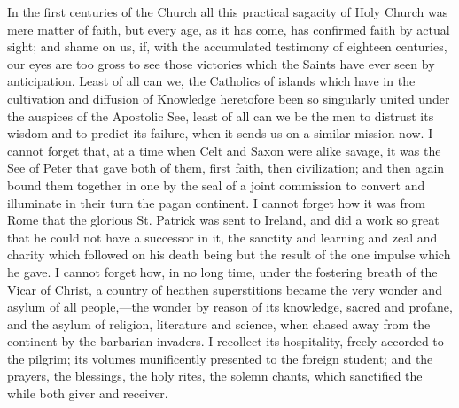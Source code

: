 In the first centuries of the Church all this practical sagacity of Holy Church was mere matter of faith, but every age, as it
has come, has confirmed faith by actual sight; and shame on us, if,
with the accumulated testimony of eighteen centuries, our eyes are too
gross to see those victories which the Saints have ever seen by
anticipation. Least of all can we, the Catholics of islands which have
in the cultivation and diffusion of Knowledge heretofore been so
singularly united under the auspices of the Apostolic See, least of
all can we be the men to distrust its wisdom and to predict its
failure, when it sends us on a similar mission now. I cannot forget
that, at a time when Celt and Saxon were alike savage, it was the See
of Peter that gave both of them, first faith, then civilization; and
then again bound them together in one by the seal of a joint
commission to convert and illuminate in their turn the pagan
continent. I cannot forget how it was from Rome that the glorious St.
Patrick was sent to Ireland, and did a work so great that he could not
have a successor in it, the sanctity and learning and zeal and charity
which followed on his death being but the result of the one impulse
which he gave. I cannot forget how, in no long time, under the
fostering breath of the Vicar of Christ, a country of heathen
superstitions became the very wonder and asylum of all people,—the
wonder by reason of its knowledge, sacred and profane, and the asylum
of religion, literature and science, when chased away from the
continent by the barbarian invaders. I recollect its hospitality,
freely accorded to the pilgrim; its volumes munificently presented to
the foreign student; and the prayers, the blessings, the holy rites,
the solemn chants, which sanctified the while both giver and receiver.

